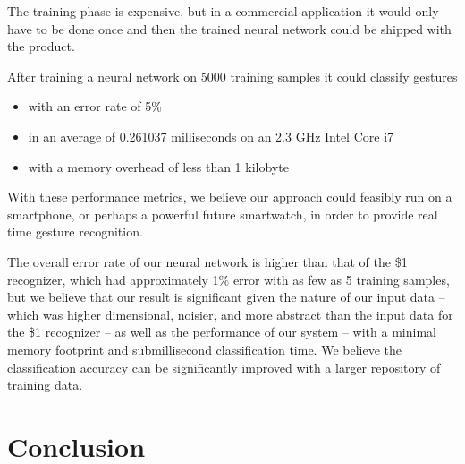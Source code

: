 \documentclass{report}
\begin{document}
The training phase is expensive, but in a commercial application it would only have to be done once and then the trained neural network could be shipped with the product.

After training a neural network on 5000 training samples it could classify gestures
\begin{itemize}
\item with an error rate of 5\%
\item in an average of 0.261037 milliseconds on an 2.3 GHz Intel Core i7
\item with a memory overhead of less than 1 kilobyte
\end{itemize}
With these performance metrics, we believe our approach could feasibly run on a smartphone, or perhaps a powerful future smartwatch, in order to provide real time gesture recognition.

The overall error rate of our neural network is higher than that of the \$1 recognizer, which had approximately 1\% error with as few as 5 training samples, but we believe that our result is significant given the nature of our input data -- which was higher dimensional, noisier, and more abstract than the input data for the \$1 recognizer -- as well as the performance of our system -- with a minimal memory footprint and submillisecond classification time. We believe the classification accuracy can be significantly improved with a larger repository of training data.

\chapter{Conclusion}


\printbibliography
\end{document}
